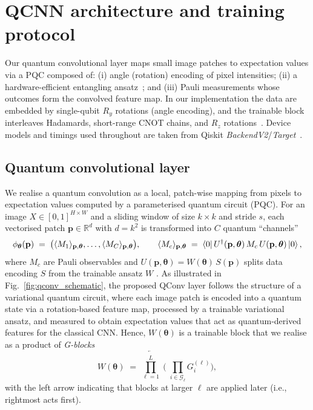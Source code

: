 \section{QCNN architecture and training protocol}

Our quantum convolutional layer maps small image patches to expectation values via a PQC composed of:
(i) angle (rotation) encoding of pixel intensities; (ii) a hardware-efficient entangling ansatz~\cite{Kandala2017};
and (iii) Pauli measurements whose outcomes form the convolved feature map. In our implementation the data are embedded by single-qubit $R_y$ rotations
(angle encoding), and the trainable block interleaves Hadamards, short-range CNOT
chains, and $R_z$ rotations~\cite{Qiskit2019}.
Device models and timings used throughout are taken from Qiskit \emph{BackendV2}/\emph{Target}~\cite{QiskitBackendV2Docs,QiskitTargetDocs}.


\subsection{Quantum convolutional layer}
We realise a quantum convolution as a local, patch-wise mapping from pixels to expectation values computed by a parameterised quantum circuit (PQC). For an image $X\!\in\![0,1]^{H\times W}$ and a sliding window of size $k\times k$ and stride $s$, each vectorised patch $\mathbf{p}\in\mathbb{R}^{d}$ with $d=k^2$ is transformed into $C$ quantum ``channels''
\begin{equation}
\phi_{\boldsymbol{\theta}}(\mathbf{p}) \;=\; \big(\langle M_1\rangle_{\mathbf{p},\boldsymbol{\theta}},\dots,\langle M_C\rangle_{\mathbf{p},\boldsymbol{\theta}}\big),\qquad
\langle M_c\rangle_{\mathbf{p},\boldsymbol{\theta}} \;=\; \bra{0}U^\dagger(\mathbf{p},\boldsymbol{\theta})\,M_c\,U(\mathbf{p},\boldsymbol{\theta})\ket{0},
\label{eq:qconv-core}
\end{equation}
where $M_c$ are Pauli observables and $U(\mathbf{p},\boldsymbol{\theta})=W(\boldsymbol{\theta})\,S(\mathbf{p})$ splits data encoding $S$ from the trainable ansatz $W$ \cite{Benedetti2019,cerezo2021}.
As illustrated in Fig.~\ref{fig:qconv_schematic}, the proposed QConv layer
follows the structure of a variational quantum circuit, where each image patch is encoded into a quantum state via a rotation-based feature map,
processed by a trainable variational ansatz, and measured to obtain expectation
values that act as quantum-derived features for the classical CNN. Hence, 
$W(\boldsymbol{\theta})$ is a trainable block that we realise as a product of \emph{G-blocks}
\begin{equation*}
W(\boldsymbol{\theta}) \;=\; \overleftarrow{\prod_{\ell=1}^{L}} \;\Bigg(\; \prod_{i \in \mathcal{G}_{\ell}} G_{i}^{(\ell)} \Bigg),
\end{equation*}
with the left arrow indicating that blocks at larger $\ell$ are applied later (i.e., rightmost acts first).

